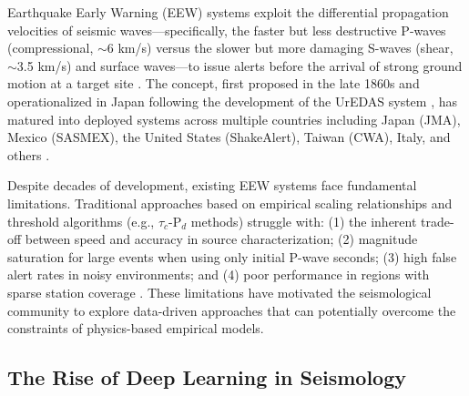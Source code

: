 \documentclass[review,authoryear]{elsarticle}
\begin{document}
Earthquake Early Warning (EEW) systems exploit the differential propagation velocities of seismic waves---specifically, the faster but less destructive P-waves (compressional, $\sim$6 km/s) versus the slower but more damaging S-waves (shear, $\sim$3.5 km/s) and surface waves---to issue alerts before the arrival of strong ground motion at a target site \citep{allen2003potential, allen2012earthquake, allen2019eew}. The concept, first proposed in the late 1860s and operationalized in Japan following the development of the UrEDAS system \citep{nakamura1988urgency}, has matured into deployed systems across multiple countries including Japan (JMA), Mexico (SASMEX), the United States (ShakeAlert), Taiwan (CWA), Italy, and others \citep{gasparini2007earthquake, given2018shakealert, hsiao2009development}.

Despite decades of development, existing EEW systems face fundamental limitations. Traditional approaches based on empirical scaling relationships and threshold algorithms (e.g., $\tau_c$-P$_d$ methods) struggle with: (1) the inherent trade-off between speed and accuracy in source characterization; (2) magnitude saturation for large events when using only initial P-wave seconds; (3) high false alert rates in noisy environments; and (4) poor performance in regions with sparse station coverage \citep{satriano2011earthquake, bose2018finder}. These limitations have motivated the seismological community to explore data-driven approaches that can potentially overcome the constraints of physics-based empirical models.

\subsection{The Rise of Deep Learning in Seismology}
\end{document}

